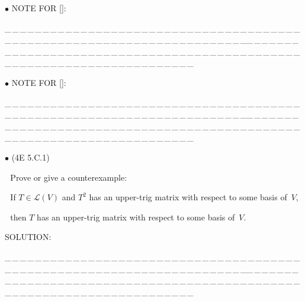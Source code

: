 \documentclass[a4paper, 11pt, UTF8]{article}
\def\Lm{\mathcal{L}}
\begin{document}
\begin{large}
{\small $\bullet$} {\timesbf\Large N{\normalsize OTE} F{\normalsize OR} []:}
\par
{\tiny \_\,\_\,\_\,\_\,\_\,\_\,\_\,\_\,\_\,\_\,\_\,\_\,\_\,\_\,\_\,\_\,\_\,\_\,\_\,\_\,\_\,\_\,\_\,\_\,\_\,\_\,\_\,\_\,\_\,\_\,\_\,\_\,\_\,\_\,\_\,\_\,\_\,\_\,\_\,\_\,\_\,\_\,\_\,\_\,\_\,\_\,\_\,\_\,\_\,\_\,\_\,\_\,\_\,\_\,\_\,\_\,\_\,\_\,\_\,\_\,\_\,\_\,\_\,\_\,\_\,\_\,\_\,\_\,\_\,\_\,\_\_\,\_\,\_\,\_\,\_\,\_\,\_\,\_\,\_\,\_\,\_\,\_\,\_\,\_\,\_\,\_\,\_\,\_\,\_\,\_\,\_\,\_\,\_\,\_\,\_\,\_\,\_\,\_\,\_\,\_\,\_\,\_\,\_\,\_\,\_\,\_\,\_\,\_\,\_\,\_\,\_\,\_\,\_\,\_\,\_\,\_\,\_\,\_\,\_\,\_\,\_\,\_\,\_\,\_\,\_\,\_\,\_\,\_\,\_\,\_\,\_\,\_\,\_\,\_\,\_\,\_\,\_\,\_\,\_\,\_\,\_}\par

{\small $\bullet$} {\timesbf\Large N{\normalsize OTE} F{\normalsize OR} []:}
\par
{\tiny \_\,\_\,\_\,\_\,\_\,\_\,\_\,\_\,\_\,\_\,\_\,\_\,\_\,\_\,\_\,\_\,\_\,\_\,\_\,\_\,\_\,\_\,\_\,\_\,\_\,\_\,\_\,\_\,\_\,\_\,\_\,\_\,\_\,\_\,\_\,\_\,\_\,\_\,\_\,\_\,\_\,\_\,\_\,\_\,\_\,\_\,\_\,\_\,\_\,\_\,\_\,\_\,\_\,\_\,\_\,\_\,\_\,\_\,\_\,\_\,\_\,\_\,\_\,\_\,\_\,\_\,\_\,\_\,\_\,\_\,\_\_\,\_\,\_\,\_\,\_\,\_\,\_\,\_\,\_\,\_\,\_\,\_\,\_\,\_\,\_\,\_\,\_\,\_\,\_\,\_\,\_\,\_\,\_\,\_\,\_\,\_\,\_\,\_\,\_\,\_\,\_\,\_\,\_\,\_\,\_\,\_\,\_\,\_\,\_\,\_\,\_\,\_\,\_\,\_\,\_\,\_\,\_\,\_\,\_\,\_\,\_\,\_\,\_\,\_\,\_\,\_\,\_\,\_\,\_\,\_\,\_\,\_\,\_\,\_\,\_\,\_\,\_\,\_\,\_\,\_\,\_}\par

{\small $\bullet$} ({\normalsize4E 5.C.1})\par\,\, {\timessl\Large 
Prove or give a counterexample:}\par\,\,
{\timessl\Large If $T\in \Lm(V)$ and $T^2$ has an upper-trig matrix with respect to some basis of \,$V$,}\par\,\,
{\timessl\Large then $T$ has an upper-trig matrix with respect to some basis of \,$V$.
}\par
{\timesbf S\footnotesize{OLUTION:}}\par\quad

\par
{\tiny \_\,\_\,\_\,\_\,\_\,\_\,\_\,\_\,\_\,\_\,\_\,\_\,\_\,\_\,\_\,\_\,\_\,\_\,\_\,\_\,\_\,\_\,\_\,\_\,\_\,\_\,\_\,\_\,\_\,\_\,\_\,\_\,\_\,\_\,\_\,\_\,\_\,\_\,\_\,\_\,\_\,\_\,\_\,\_\,\_\,\_\,\_\,\_\,\_\,\_\,\_\,\_\,\_\,\_\,\_\,\_\,\_\,\_\,\_\,\_\,\_\,\_\,\_\,\_\,\_\,\_\,\_\,\_\,\_\,\_\,\_\_\,\_\,\_\,\_\,\_\,\_\,\_\,\_\,\_\,\_\,\_\,\_\,\_\,\_\,\_\,\_\,\_\,\_\,\_\,\_\,\_\,\_\,\_\,\_\,\_\,\_\,\_\,\_\,\_\,\_\,\_\,\_\,\_\,\_\,\_\,\_\,\_\,\_\,\_\,\_\,\_\,\_\,\_\,\_\,\_\,\_\,\_\,\_\,\_\,\_\,\_\,\_\,\_\,\_\,\_\,\_\,\_\,\_\,\_\,\_\,\_\,\_\,\_\,\_\,\_\,\_\,\_\,\_\,\_\,\_\,\_}\par


\end{large}
\end{document}
